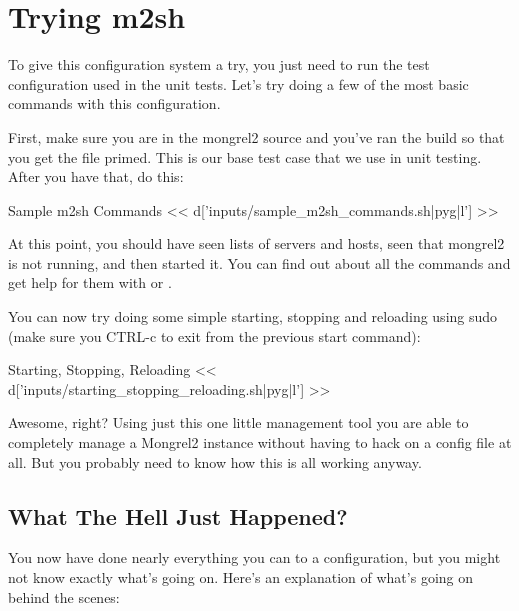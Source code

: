 \section{Trying m2sh}

To give this configuration system a try, you just need to run the test configuration used
in the unit tests.  Let's try doing a few of the most basic commands with this configuration.

First, make sure you are in the mongrel2 source and you've ran the build so that you get the
 file primed.  This is our base test case that we use in unit testing.
After you have that, do this:

\begin{code}{Sample m2sh Commands}
<< d['inputs/sample_m2sh_commands.sh|pyg|l'] >>
\end{code}

At this point, you should have seen lists of servers and hosts, seen that mongrel2 is
not running, and then started it.  You can find out about all the commands and
get help for them with  or .

You can now try doing some simple starting, stopping and reloading using sudo (make sure you CTRL-c
to exit from the previous start command):

\begin{code}{Starting, Stopping, Reloading}
<< d['inputs/starting_stopping_reloading.sh|pyg|l'] >>
\end{code}

Awesome, right?  Using just this one little management tool you
are able to completely manage a Mongrel2 instance without having to hack
on a config file at all.  But you probably need to know how this is all
working anyway.


\subsection{What The Hell Just Happened?}

You now have done nearly everything you can to a configuration, but you might not know exactly
what's going on.  Here's an explanation of what's going on behind the scenes:

